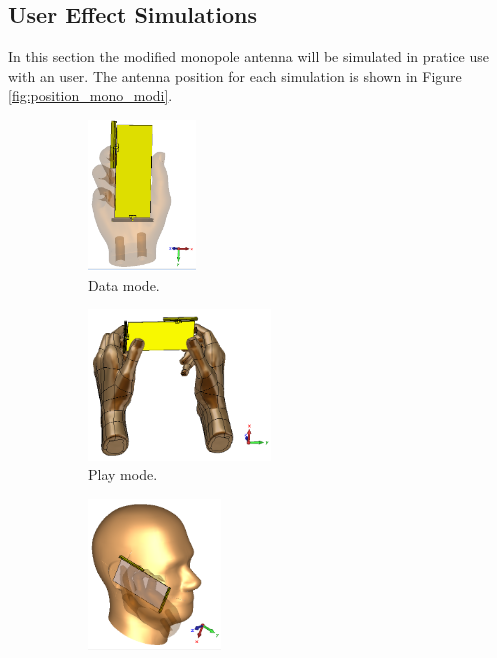 \FloatBarrier
\subsection{User Effect Simulations}
In this section the modified monopole antenna will be simulated in pratice use with an user. The antenna position for each simulation is shown in Figure \ref{fig:position_mono_modi}.

\begin{figure}[htbp]
    \centering
    \begin{subfigure}[b]{0.24\linewidth}
        \centering \includegraphics[width=\linewidth,height=4cm,keepaspectratio]{img/tech_sol/monopole/highband/ue/datamode/3d_datamode.PNG}
        \caption{Data mode.}
    \end{subfigure}
    \begin{subfigure}[b]{0.24\linewidth}
        \centering \includegraphics[width=\linewidth,height=4cm,keepaspectratio]{img/tech_sol/monopole/highband/ue/playmode/3d_playmode.PNG}
        \caption{Play mode.}
    \end{subfigure}
    \begin{subfigure}[b]{0.24\linewidth}
        \centering \includegraphics[width=\linewidth,height=4cm,keepaspectratio]{img/tech_sol/monopole/highband/ue/talkmode/3d_talkmode.PNG}

\end{subfigure}
\end{figure}
